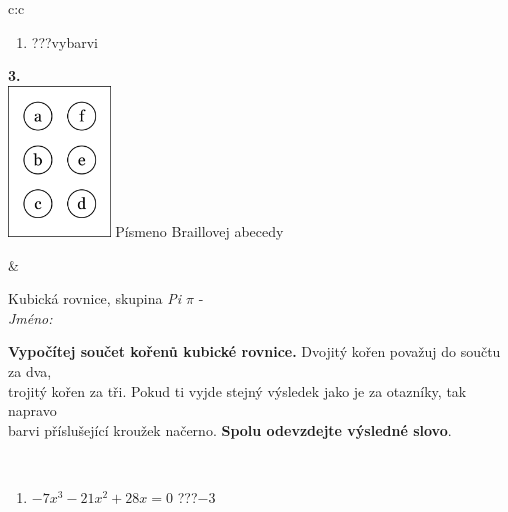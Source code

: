 \documentclass[10pt]{report}
\begin{document}
\begin{tabular}{c:c}
\begin{minipage}[c][104.5mm][t]{0.5\linewidth}
\begin{center}
\begin{minipage}{0.79\linewidth}
\begin{center}
\begin{varwidth}{\linewidth}
\begin{enumerate}
\item \quad \dotfill\; ???\;\dotfill \quad vybarvi
\end{enumerate}
\end{varwidth}
\end{center}
\end{minipage}
\begin{minipage}{0.20\linewidth}
\begin{center}
{\Huge\bfseries 3.} \\[2mm]
\includegraphics[height=40mm]{../images/braille.png}
{\small Písmeno Braillovej abecedy}
\end{center}
\end{minipage}
\end{center}
\end{minipage}
&
\begin{minipage}[c][104.5mm][t]{0.5\linewidth}
\begin{center}
\vspace{7mm}
{\huge Kubická rovnice, skupina \textit{Pi $\pi$} -}\\[5mm]
\textit{Jméno:}\phantom{xxxxxxxxxxxxxxxxxxxxxxxxxxxxxxxxxxxxxxxxxxxxxxxxxxxxxxxxxxxxxxxxx}\\[5mm]
\begin{minipage}{0.95\linewidth}
\begin{center}
\textbf{Vypočítej součet kořenů kubické rovnice.} Dvojitý kořen považuj do součtu za dva,\\trojitý kořen za tři. Pokud ti vyjde stejný výsledek jako je za otazníky, tak napravo\\barvi příslušející kroužek načerno. \textbf{Spolu odevzdejte výsledné slovo}.
\end{center}
\end{minipage}
\\[1mm]
\begin{minipage}{0.79\linewidth}
\begin{center}
\begin{varwidth}{\linewidth}
\begin{enumerate}
\Large
\item $-7x^3-21x^2+28x=0$\quad \dotfill\; ???\;\dotfill \quad $-3$

\end{enumerate}
\end{varwidth}
\end{center}
\end{minipage}
\end{center}
\end{minipage}
\end{tabular}
\end{document}
